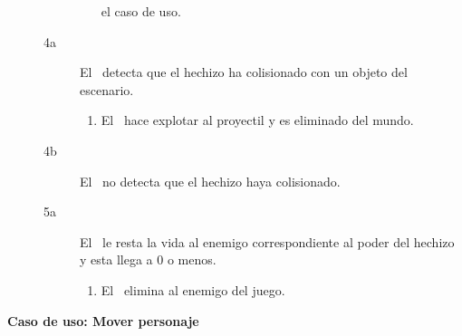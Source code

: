\begin{description}
\begin{description}
\begin{enumerate}
                    el caso de uso.
                \end{enumerate}
            \item [4a] El \sistema\ detecta que el hechizo ha colisionado con
            un objeto del escenario.
                \begin{enumerate}
                    \item El \sistema\ hace explotar al proyectil y es eliminado
                    del mundo.
                \end{enumerate}
            \item [4b] El \sistema\ no detecta que el hechizo haya colisionado.
            \item [5a] El \sistema\ le resta la vida al enemigo correspondiente
            al poder del hechizo y esta llega a 0 o menos.
                \begin{enumerate}
                    \item El \sistema\ elimina al enemigo del juego.\\
                \end{enumerate}
        \end{description}
    
\end{description}


\textbf{Caso de uso: Mover personaje}

